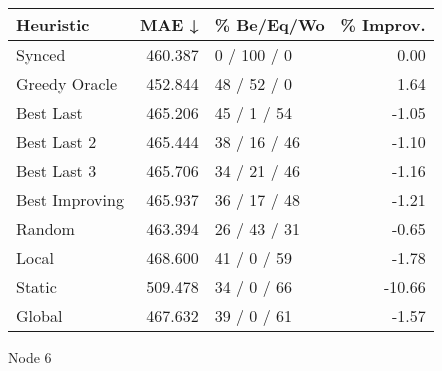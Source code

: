 \begin{tabular}{lrlr}
\toprule
\textbf{Heuristic} & \textbf{MAE ↓} & \textbf{\% Be/Eq/Wo} & \textbf{\% Improv.} \\
\midrule
            Synced &        460.387 &          0 / 100 / 0 &                0.00 \\
     Greedy Oracle &        452.844 &          48 / 52 / 0 &                1.64 \\
         Best Last &        465.206 &          45 / 1 / 54 &               -1.05 \\
       Best Last 2 &        465.444 &         38 / 16 / 46 &               -1.10 \\
       Best Last 3 &        465.706 &         34 / 21 / 46 &               -1.16 \\
    Best Improving &        465.937 &         36 / 17 / 48 &               -1.21 \\
            Random &        463.394 &         26 / 43 / 31 &               -0.65 \\
             Local &        468.600 &          41 / 0 / 59 &               -1.78 \\
            Static &        509.478 &          34 / 0 / 66 &              -10.66 \\
            Global &        467.632 &          39 / 0 / 61 &               -1.57 \\
\bottomrule
\end{tabular}
\caption{Node 6}
\label{tab:iid_lr05_le2_bs2_6}
